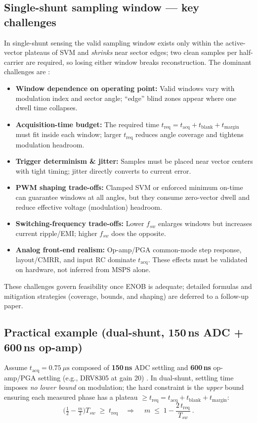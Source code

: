 \documentclass[conference]{IEEEtran}
\begin{document}
\subsection{Single-shunt sampling window — key challenges}
In single-shunt sensing the valid sampling window exists only within the active-vector plateaus of SVM and \emph{shrinks} near sector edges; two clean samples per half-carrier are required, so losing either window breaks reconstruction. The dominant challenges are \cite{ACTAcabezas_new_2024}:
\begin{itemize}
  \item \textbf{Window dependence on operating point:} Valid windows vary with modulation index and sector angle; “edge” blind zones appear where one dwell time collapses.
  \item \textbf{Acquisition-time budget:} The required time \(t_{\mathrm{req}}=t_{\mathrm{acq}}+t_{\mathrm{blank}}+t_{\mathrm{margin}}\) must fit inside each window; larger \(t_{\mathrm{req}}\) reduces angle coverage and tightens modulation headroom.
  \item \textbf{Trigger determinism \& jitter:} Samples must be placed near vector centers with tight timing; jitter directly converts to current error.
  \item \textbf{PWM shaping trade-offs:} Clamped SVM or enforced minimum on-time can guarantee windows at all angles, but they consume zero-vector dwell and reduce effective voltage (modulation) headroom.
  \item \textbf{Switching-frequency trade-offs:} Lower \(f_{sw}\) enlarges windows but increases current ripple/EMI; higher \(f_{sw}\) does the opposite.
  \item \textbf{Analog front-end realism:} Op-amp/PGA common-mode step response, layout/CMRR, and input RC dominate \(t_{\mathrm{acq}}\). These effects must be validated on hardware, not inferred from MSPS alone.
\end{itemize}
\noindent These challenges govern feasibility once ENOB is adequate; detailed formulas and mitigation strategies (coverage, bounds, and shaping) are deferred to a follow-up paper.



\subsection{Practical example (dual-shunt, 150\,ns ADC + 600\,ns op-amp)}
Assume \(t_{\mathrm{acq}}=0.75~\mu\text{s}\) composed of \textbf{150\,ns} ADC settling and \textbf{600\,ns} op-amp/PGA settling (e.g., DRV8305 at gain 20) \cite{TI_SLAAE96A_2023}. In dual-shunt, settling time imposes \emph{no lower bound} on modulation; the hard constraint is the \emph{upper} bound ensuring each measured phase has a plateau \(\ge t_{\mathrm{req}}=t_{\mathrm{acq}}+t_{\mathrm{blank}}+t_{\mathrm{margin}}\):
\[
\Big(\tfrac{1}{2}-\tfrac{m}{2}\Big)T_{sw} \;\ge\; t_{\mathrm{req}}
\quad\Rightarrow\quad
\boxed{~ m \;\le\; 1 - \frac{2\,t_{\mathrm{req}}}{T_{sw}} ~}.
\]
\end{document}
